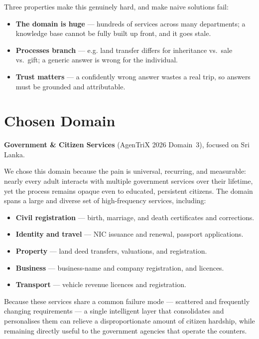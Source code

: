 \documentclass[11pt,a4paper]{article}
\newcommand{\lead}[1]{\textbf{\color{ink}#1}}
\begin{document}
Three properties make this genuinely hard, and make naive solutions fail:
\begin{itemize}
  \item \lead{The domain is huge} --- hundreds of services across many departments; a knowledge base
        cannot be fully built up front, and it goes stale.
  \item \lead{Processes branch} --- e.g. land transfer differs for inheritance vs.\ sale vs.\ gift;
        a generic answer is wrong for the individual.
  \item \lead{Trust matters} --- a confidently wrong answer wastes a real trip, so answers must be
        grounded and attributable.
\end{itemize}

\section{Chosen Domain}
\lead{Government \& Citizen Services} (AgenTriX 2026 Domain~3), focused on Sri Lanka.

We chose this domain because the pain is universal, recurring, and measurable: nearly every adult
interacts with multiple government services over their lifetime, yet the process remains opaque even
to educated, persistent citizens. The domain spans a large and diverse set of high-frequency services,
including:
\begin{itemize}
  \item \lead{Civil registration} --- birth, marriage, and death certificates and corrections.
  \item \lead{Identity and travel} --- NIC issuance and renewal, passport applications.
  \item \lead{Property} --- land deed transfers, valuations, and registration.
  \item \lead{Business} --- business-name and company registration, and licences.
  \item \lead{Transport} --- vehicle revenue licences and registration.
\end{itemize}
Because these services share a common failure mode --- scattered and frequently
changing requirements --- a single intelligent layer that consolidates and personalises them can
relieve a disproportionate amount of citizen hardship, while remaining directly useful to the
government agencies that operate the counters.

\end{document}
